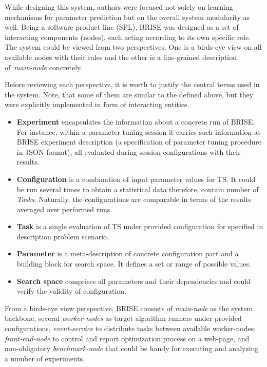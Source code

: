 While designing this system, authors were focused not solely on learning mechanisms for parameter prediction but on the overall system modularity as well.
Being a software product line (SPL), BRISE was designed as a set of interacting components (nodes), each acting according to its own specific role. 
The system could be viewed from two perspectives. One is a birds-eye view on all available nodes with their roles and the other is a fine-grained description of~\textit{main-node} concretely.

Before reviewing each perspective, it is worth to justify the central terms used in the system. Note, that some of them are similar to the defined above, but they were explicitly implemented in form of interacting entities.
\begin{itemize}
	\item \textbf{Experiment} encapsulates the information about a concrete run of BRISE. For instance, within a parameter tuning session it carries such information as BRISE experiment description (a specification of parameter tuning procedure in JSON format), all evaluated during session configurations with their results.

	\item \textbf{Configuration} is a combination of input parameter values for TS. It could be run several times to obtain a statistical data therefore, contain number of \emph{Tasks}. Naturally, the configurations are comparable in terms of the results averaged over performed runs.

	\item \textbf{Task} is a single evaluation of TS under provided configuration for specified in description problem scenario.

	\item \textbf{Parameter} is a meta-description of concrete configuration part and a building block for search space. It defines a set or range of possible values.

	\item \textbf{Search space} comprises all parameters and their dependencies and could verify the validity of configuration.
\end{itemize}

From a birds-eye view perspective, BRISE consists of \emph{main-node} as the system backbone, several \emph{worker-nodes} as target algorithm runners under provided configurations, \emph{event-service} to distribute tasks between available worker-nodes, \emph{front-end-node} to control and report optimization process on a web-page, and non-obligatory \emph{benchmark-node} that could be handy for executing and analyzing a number of experiments.

